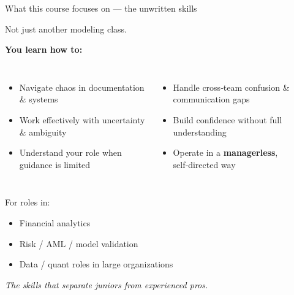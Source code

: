 \documentclass[aspectratio=169, 11pt]{beamer}
\begin{document}
	\begin{frame}{What this course focuses on — the unwritten skills}
		\begin{center}
			\large{Not just another modeling class.}
		\end{center}
		\vspace{0.2cm}
		\textbf{You learn how to:}
		\begin{columns}[T]
			\begin{itemize}
				\item Navigate chaos in documentation \& systems
				\item Work effectively with uncertainty \& ambiguity
				\item Understand your role when guidance is limited
			\end{itemize}
			\begin{itemize}
				\item Handle cross‑team confusion \& communication gaps
				\item Build confidence without full understanding
				\item Operate in a \textbf{managerless}, self‑directed way
			\end{itemize}
		\end{columns}
		\vspace{0.3cm}
		\alert{For roles in:}
		\begin{itemize}
			\item Financial analytics
			\item Risk / AML / model validation
			\item Data / quant roles in large organizations
		\end{itemize}
		\vspace{0.1cm}
		\textit{The skills that separate juniors from experienced pros.}
	\end{frame}
	
\end{document}
